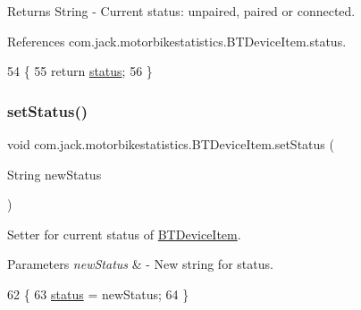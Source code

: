 \begin{DoxyReturn}{Returns}
String -\/ Current status\+: unpaired, paired or connected. 
\end{DoxyReturn}


References com.\+jack.\+motorbikestatistics.\+B\+T\+Device\+Item.\+status.


\begin{DoxyCode}
54                               \{
55         \textcolor{keywordflow}{return} \hyperlink{classcom_1_1jack_1_1motorbikestatistics_1_1_b_t_device_item_ae7a8756973644c5719d5faddf3fa7946}{status};
56     \}
\end{DoxyCode}
\mbox{\label{classcom_1_1jack_1_1motorbikestatistics_1_1_b_t_device_item_a4e3d0774e91c5261963b03d6dcb08561}} 
\subsubsection{\texorpdfstring{set\+Status()}{setStatus()}}
{\footnotesize\ttfamily void com.\+jack.\+motorbikestatistics.\+B\+T\+Device\+Item.\+set\+Status (\begin{DoxyParamCaption}\item[{String}]{new\+Status }\end{DoxyParamCaption})\hspace{0.3cm}{\ttfamily [inline]}}



Setter for current status of \hyperlink{classcom_1_1jack_1_1motorbikestatistics_1_1_b_t_device_item}{B\+T\+Device\+Item}. 


\begin{DoxyParams}{Parameters}
{\em new\+Status} & -\/ New string for status. \\
\hline
\end{DoxyParams}

\begin{DoxyCode}
62                                             \{
63         \hyperlink{classcom_1_1jack_1_1motorbikestatistics_1_1_b_t_device_item_ae7a8756973644c5719d5faddf3fa7946}{status} = newStatus;
64     \}
\end{DoxyCode}
\mbox{\label{classcom_1_1jack_1_1motorbikestatistics_1_1_b_t_device_item_a9e16b980dbddfdb9347ffa6237b78de5}} 
